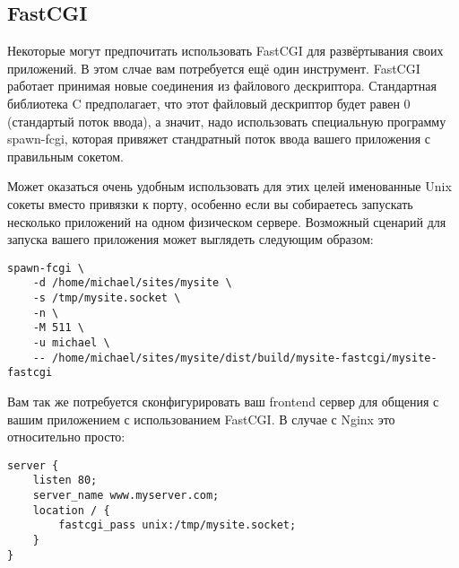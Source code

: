 \subsection{FastCGI}
%
%
Некоторые могут предпочитать использовать FastCGI для развёртывания своих приложений. В этом слчае вам потребуется ещё один инструмент. FastCGI работает принимая новые соединения из файлового дескриптора. Стандартная библиотека C предполагает, что этот файловый дескриптор будет равен 0 (стандартый поток ввода), а значит, надо использовать специальную программу spawn-fcgi, которая привяжет стандратный поток ввода вашего приложения с правильным сокетом.


Может оказаться очень удобным использовать для этих целей именованные Unix сокеты вместо привязки к порту, особенно если вы собираетесь запускать несколько приложений на одном физическом сервере. Возможный сценарий для запуска вашего приложения может выглядеть следующим образом:

\begin{lstlisting}
spawn-fcgi \
    -d /home/michael/sites/mysite \
    -s /tmp/mysite.socket \
    -n \
    -M 511 \
    -u michael \
    -- /home/michael/sites/mysite/dist/build/mysite-fastcgi/mysite-fastcgi
\end{lstlisting}
%
Вам так же потребуется сконфигурировать ваш frontend сервер для общения с вашим приложением с использованием FastCGI. В случае с Nginx это относительно просто:
%
\begin{lstlisting}
server {
    listen 80;
    server_name www.myserver.com;
    location / {
        fastcgi_pass unix:/tmp/mysite.socket;
    }
}
\end{lstlisting}
%

